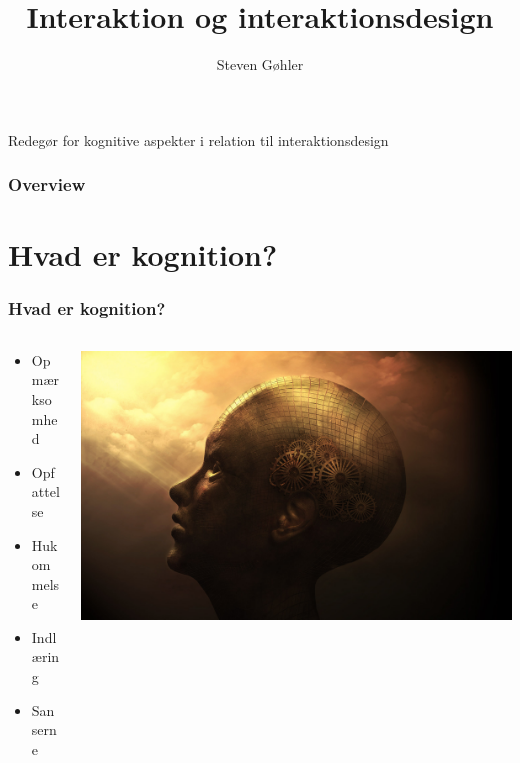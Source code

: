 \documentclass{beamer}
\title{Interaktion og interaktionsdesign}
\author{Steven Gøhler}
\begin{document}
\begin{frame}
\titlepage
Redegør for kognitive aspekter i relation til interaktionsdesign
\end{frame}

\begin{frame}
  \frametitle{Overview}
  \tableofcontents
\end{frame}

\section{Hvad er kognition?}
\begin{frame}
\frametitle{Hvad er kognition?}
  \begin{columns}[T]
    \begin{column}{.5\textwidth}
	  \begin{itemize}
		\item Opmærksomhed
		\item Opfattelse
	    \item Hukommelse
	    \item Indlæring
	    \item Sanserne
	  \end{itemize}
    \end{column}
    \begin{column}{.5\textwidth}
      \includegraphics[width=\textwidth]{kognition.jpg}
    \end{column}
  \end{columns}
\end{frame}
\end{document}
